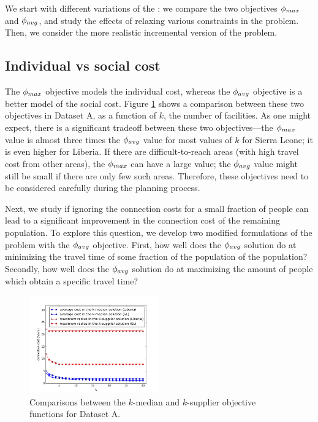 
We start with different variations of the \probstatic{}: we compare the two objectives
$\phi_{max}$ and $\phi_{avg}$, and study the effects of relaxing various constraints in the problem.
Then, we consider the more realistic incremental version of the problem.

\subsection*{Individual vs social cost}
The $\phi_{max}$ objective models the individual cost, whereas the $\phi_{avg}$ objective
is a better model of the social cost. 
Figure \ref{fig:kmed_vs_ksup} shows a comparison between these two objectives in Dataset A, as a function of
$k$, the number of facilities.
As one might expect, there is a significant tradeoff between these two objectives---the $\phi_{max}$ value
is almost three times the $\phi_{avg}$ value for most values of $k$ for Sierra Leone; it is even higher for Liberia.
If there are difficult-to-reach areas (with high travel cost from other areas),
the $\phi_{max}$ can have a large value; the $\phi_{avg}$ value might still be small if there are only
few such areas.  Therefore, these objectives need to be considered carefully during the planning process.

Next, we study if ignoring the connection costs for a small fraction of people can lead to a
significant improvement in the connection cost of the remaining population.
To explore this question, we develop two modified formulations of the \probstatic{} problem with the
$\phi_{avg}$ objective.
First, how well does the $\phi_{avg}$ solution do at minimizing the travel time of some fraction of 
the population of the population? 
Secondly, how well does the $\phi_{avg}$ solution
do at maximizing the amount of people which obtain a specific travel time? 




\begin{figure}[h]
\centering
\includegraphics[width=0.5\textwidth]{new_figs/plot_A_kmed_vs_ksup.png}
\caption{Comparisons between the $k$-median and $k$-supplier objective functions for Dataset A.}\label{fig:kmed_vs_ksup}
\end{figure}


